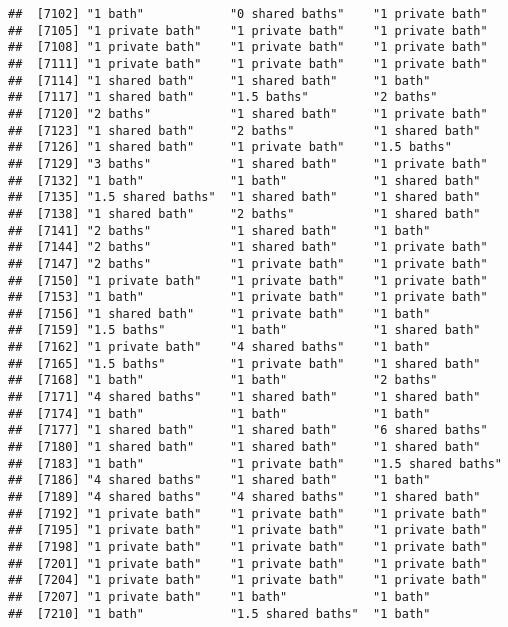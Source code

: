 \documentclass[
]{article}
\begin{document}
\begin{verbatim}
##  [7102] "1 bath"            "0 shared baths"    "1 private bath"   
##  [7105] "1 private bath"    "1 private bath"    "1 private bath"   
##  [7108] "1 private bath"    "1 private bath"    "1 private bath"   
##  [7111] "1 private bath"    "1 private bath"    "1 private bath"   
##  [7114] "1 shared bath"     "1 shared bath"     "1 bath"           
##  [7117] "1 shared bath"     "1.5 baths"         "2 baths"          
##  [7120] "2 baths"           "1 shared bath"     "1 private bath"   
##  [7123] "1 shared bath"     "2 baths"           "1 shared bath"    
##  [7126] "1 shared bath"     "1 private bath"    "1.5 baths"        
##  [7129] "3 baths"           "1 shared bath"     "1 private bath"   
##  [7132] "1 bath"            "1 bath"            "1 shared bath"    
##  [7135] "1.5 shared baths"  "1 shared bath"     "1 shared bath"    
##  [7138] "1 shared bath"     "2 baths"           "1 shared bath"    
##  [7141] "2 baths"           "1 shared bath"     "1 bath"           
##  [7144] "2 baths"           "1 shared bath"     "1 private bath"   
##  [7147] "2 baths"           "1 private bath"    "1 private bath"   
##  [7150] "1 private bath"    "1 private bath"    "1 private bath"   
##  [7153] "1 bath"            "1 private bath"    "1 private bath"   
##  [7156] "1 shared bath"     "1 private bath"    "1 bath"           
##  [7159] "1.5 baths"         "1 bath"            "1 shared bath"    
##  [7162] "1 private bath"    "4 shared baths"    "1 bath"           
##  [7165] "1.5 baths"         "1 private bath"    "1 shared bath"    
##  [7168] "1 bath"            "1 bath"            "2 baths"          
##  [7171] "4 shared baths"    "1 shared bath"     "1 shared bath"    
##  [7174] "1 bath"            "1 bath"            "1 bath"           
##  [7177] "1 shared bath"     "1 shared bath"     "6 shared baths"   
##  [7180] "1 shared bath"     "1 shared bath"     "1 shared bath"    
##  [7183] "1 bath"            "1 private bath"    "1.5 shared baths" 
##  [7186] "4 shared baths"    "1 shared bath"     "1 bath"           
##  [7189] "4 shared baths"    "4 shared baths"    "1 shared bath"    
##  [7192] "1 private bath"    "1 private bath"    "1 private bath"   
##  [7195] "1 private bath"    "1 private bath"    "1 private bath"   
##  [7198] "1 private bath"    "1 private bath"    "1 private bath"   
##  [7201] "1 private bath"    "1 private bath"    "1 private bath"   
##  [7204] "1 private bath"    "1 private bath"    "1 private bath"   
##  [7207] "1 private bath"    "1 bath"            "1 bath"           
##  [7210] "1 bath"            "1.5 shared baths"  "1 bath"           

\end{verbatim}
\end{document}
